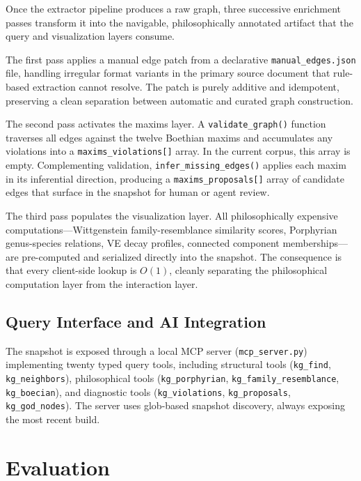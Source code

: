 \documentclass{iosart2x}
\begin{document}
Once the extractor pipeline produces a raw graph, three successive enrichment passes transform it into the navigable, philosophically annotated artifact that the query and visualization layers consume.

The first pass applies a manual edge patch from a declarative \texttt{manual\_edges.json} file, handling irregular format variants in the primary source document that rule-based extraction cannot resolve. The patch is purely additive and idempotent, preserving a clean separation between automatic and curated graph construction.

The second pass activates the maxims layer. A \texttt{validate\_graph()} function traverses all edges against the twelve Boethian maxims and accumulates any violations into a \texttt{maxims\_violations[]} array. In the current corpus, this array is empty. Complementing validation, \texttt{infer\_missing\_edges()} applies each maxim in its inferential direction, producing a \texttt{maxims\_proposals[]} array of candidate edges that surface in the snapshot for human or agent review.

The third pass populates the visualization layer. All philosophically expensive computations---Wittgenstein family-resemblance similarity scores, Porphyrian genus-species relations, VE decay profiles, connected component memberships---are pre-computed and serialized directly into the snapshot. The consequence is that every client-side lookup is $O(1)$, cleanly separating the philosophical computation layer from the interaction layer.

\subsection{Query Interface and AI Integration}

The snapshot is exposed through a local MCP server (\texttt{mcp\_server.py}) implementing twenty typed query tools, including structural tools (\texttt{kg\_find}, \texttt{kg\_neighbors}), philosophical tools (\texttt{kg\_porphyrian}, \texttt{kg\_family\_resemblance}, \texttt{kg\_boecian}), and diagnostic tools (\texttt{kg\_violations}, \texttt{kg\_proposals}, \texttt{kg\_god\_nodes}). The server uses glob-based snapshot discovery, always exposing the most recent build.

\section{Evaluation}
\label{sec:evaluation}
\end{document}
